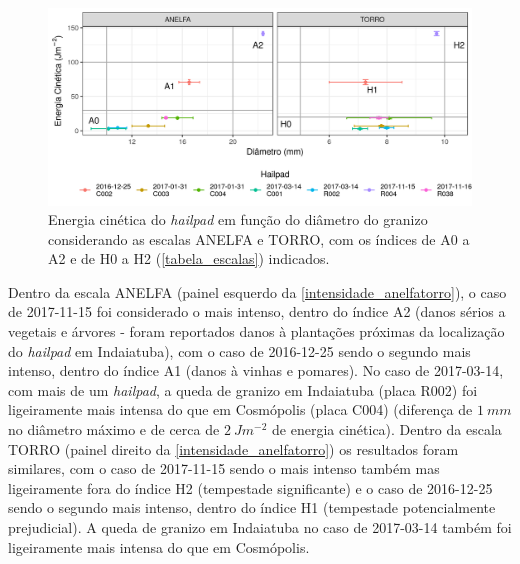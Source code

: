 \begin{figure}[htb]
	\begin{center}
		\caption{Energia cinética do \textit{hailpad} em função do diâmetro do granizo considerando as escalas ANELFA e TORRO, com os índices de A0 a A2 e de H0 a H2 (\autoref{tabela_escalas}) indicados.} 
		\label{intensidade_anelfatorro}
		\includegraphics[width=\columnwidth]{../Hailpads_Processing/figures/data_anelfa_torro_ptbr.png}
	\end{center}
\end{figure}

Dentro da escala ANELFA (painel esquerdo da \autoref{intensidade_anelfatorro}), o caso de 2017-11-15 foi considerado o mais intenso, dentro do índice A2 (danos sérios a vegetais e árvores - foram reportados danos à plantações próximas da localização do \textit{hailpad} em Indaiatuba), com o caso de 2016-12-25 sendo o segundo mais intenso, dentro do índice A1 (danos à vinhas e pomares). No caso de 2017-03-14, com mais de um \textit{hailpad}, a queda de granizo em Indaiatuba (placa R002) foi ligeiramente mais intensa do que em Cosmópolis (placa C004) (diferença de $1\:mm$ no diâmetro máximo e de cerca de $2\:Jm^{-2}$ de energia cinética). Dentro da escala TORRO (painel direito da \autoref{intensidade_anelfatorro}) os resultados foram similares, com o caso de 2017-11-15 sendo o mais intenso também mas ligeiramente fora do índice H2 (tempestade significante) e o caso de 2016-12-25 sendo o segundo mais intenso, dentro do índice H1 (tempestade potencialmente prejudicial). A queda de granizo em Indaiatuba no caso de 2017-03-14 também foi ligeiramente mais intensa do que em Cosmópolis.

